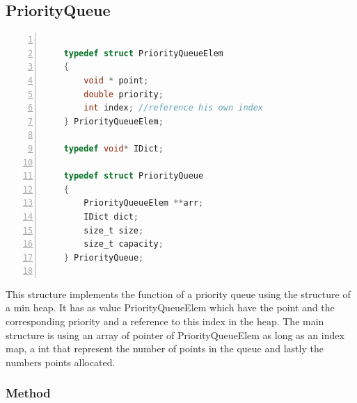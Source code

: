 \documentclass[twoside,12pt, a4paper]{report}
\begin{document}
\subsection{PriorityQueue}

\begin{lstlisting}[language=C, % Spécifie le langage du code
	caption={PriorityQueue}, % Légende du listing
	label=lst:prqueue_c, % Étiquette pour référencer le listing
	numbers=left, 
	numberstyle=\tiny\color{gray}, 
	stepnumber=1, 
	frame=single,
	breaklines=true, 
	postbreak=\mbox{\textcolor{red}{$\hookrightarrow$}\space},
	showstringspaces=false 
	]
	
	typedef struct PriorityQueueElem
	{
		void * point;
		double priority;
		int index; //reference his own index
	} PriorityQueueElem;
	
	typedef void* IDict;
	
	typedef struct PriorityQueue
	{
		PriorityQueueElem **arr;
		IDict dict;
		size_t size;
		size_t capacity;
	} PriorityQueue;
	
\end{lstlisting}

This structure implements the function of a priority queue using the structure of a min heap. It has as value PriorityQueueElem which have the point and the corresponding priority and a reference to this index in the heap. The main structure is using an array of pointer of PriorityQueueElem as long as an index map, a int that represent the number of points in the queue and lastly the numbers points allocated. 

\subsubsection{Method}
\end{document}
